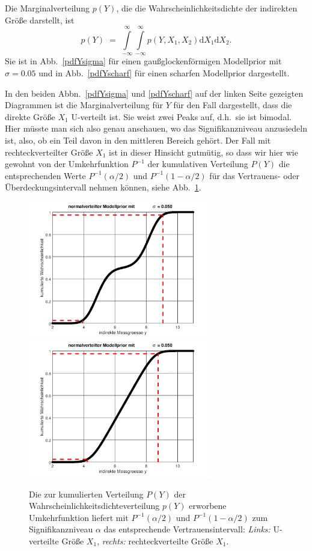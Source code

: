 Die Marginalverteilung $p(Y)$, die die Wahrscheinlichkeitsdichte der indirekten Größe darstellt, ist
\begin{equation}
p(Y) \; = \;  \int\limits_{-\infty}^{\infty}
\int\limits_{-\infty}^{\infty} p(Y,X_1,X_2) \mathrm{d}X_1 \mathrm{d}X_2 .
\label{pYmarginal}
\end{equation}
Sie ist in Abb.~\ref{pdfYsigma} für einen gaußglockenförmigen Modellprior mit $\sigma = 0.05$ und in
Abb.~\ref{pdfYscharf} für einen scharfen Modellprior dargestellt.

In den beiden Abbn.~\ref{pdfYsigma} und \ref{pdfYscharf} auf der linken Seite gezeigten
Diagrammen ist die Marginalverteilung für $Y$ für den Fall dargestellt, dass die direkte Größe 
$X_1$ U-verteilt ist. Sie weist zwei Peaks auf, d.h.\ sie ist bimodal.
Hier müsste man sich also genau anschauen, wo das Signifikanzniveau anzusiedeln ist, also, ob ein
Teil davon in den mittleren Bereich gehört. Der Fall mit rechteckverteilter Größe $X_1$ ist
in dieser Hinsicht gutmütig, so dass wir hier wie gewohnt von der Umkehrfunktion $P^{-1}$ der kumulativen
Verteilung $P(Y)$ die entsprechenden Werte $P^{-1}(\alpha/2)$ und $P^{-1}(1-\alpha/2)$ für
das Vertrauens- oder Überdeckungsintervall nehmen können,
siehe Abb.~\ref{PkumY}.
\begin{figure}
	\begin{center}
	\includegraphics[width=80mm]{10_vorlesung/media/Pkum_indirekte_y_Gauss_sigma0p050.png}
		\hspace{2mm}
	\includegraphics[width=80mm]{10_vorlesung/media/Pkum_indirekte_y_Gauss_sigma0p050_box.png}
		\caption{Die zur kumulierten Verteilung $P(Y)$ der Wahrscheinlichkeitsdichteverteilung $p(Y)$ 
			erworbene Umkehrfunktion liefert mit $P^{-1}(\alpha/2)$ und $P^{-1}(1-\alpha/2)$ zum
			Signifikanzniveau $\alpha$ das entsprechende Vertrauensintervall:
			\textsl{Links:} U-verteilte Größe $X_1$,
			\textsl{rechts:} rechteckverteilte Größe $X_1$.}
		\label{PkumY}
	\end{center}
\end{figure}
